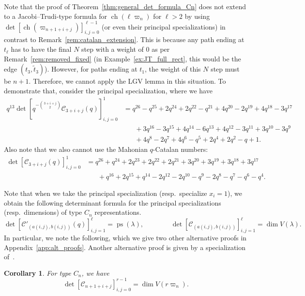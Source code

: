 \documentclass[11pt, leqno]{amsart}
\theoremstyle{plain}
\newtheorem{corollary}[theorem]{Corollary}
\theoremstyle{definition}
\numberwithin{equation}{section}
\newcommand{\fw}{\varpi} %
\newcommand{\Cat}{\mathcal{C}} %
\newcommand{\ch}{\operatorname{ch}} %
\newcommand{\ps}{\operatorname{ps}} %
\begin{document}
Note that the proof of Theorem~\ref{thm:general_det_formula_Cn} does not extend to a Jacobi--Trudi-type formula for $\ch(\ell \fw_n)$ for $\ell > 2$ by using $\det [\ch(\fw_{n+1+i+j})]_{i,j=0}^{\ell-1}$ (or even their principal specializations) in contrast to Remark~\ref{rem:catalan_extension}. This is because any path ending at $t_{\ell}$ has to have the final $N$ step with a weight of $0$ as per Remark~\ref{rem:removed_fixed} (in Example~\ref{ex:JT_full_rect}, this would be the edge $(t_3, \widetilde{t}_3)$). However, for paths ending at $t_1$, the weight of this $N$ step must be $n+1$. Therefore, we cannot apply the LGV lemma in this situation. To demonstrate that, consider the principal specialization, where we have
\begin{align*}
q^{13} \det [q^{-\binom{3+i+j}{2}} \Cat_{3+i+j}(q)]_{i,j=0}^1 & = q^{26} - q^{25} + 2q^{24} + 2q^{22} - q^{21} + 4q^{20} - 2q^{19} + 4q^{18} - 3q^{17}
\\ & \hspace{20pt} + 3q^{16} - 3q^{15} + 4q^{14} - 6q^{13} + 4q^{12} - 3q^{11} + 3q^{10} - 3q^{9}
\\ & \hspace{20pt} + 4q^{8} - 2q^{7} + 4q^{6} - q^{5} + 2q^{4} + 2q^{2} - q + 1.
\end{align*}
Also note that we also cannot use the Mahonian $q$-Catalan numbers:
\begin{align*}
\det [\Cat_{3+i+j}(q)]_{i,j=0}^1 & = q^{26} + q^{24} + 2q^{23} + 2q^{22} + 2q^{21} + 3q^{20} + 3q^{19} + 3q^{18} + 3q^{17}
\\ & \hspace{20pt} + q^{16} + 2q^{15} + q^{14} - 2q^{12} - 2q^{10} - q^{9} - 2q^{8} - q^{7} - q^{6} - q^{4}.
\end{align*}

Note that when we take the principal specialization (resp.\ specialize $x_i = 1$), we obtain the following determinant formula for the principal specializations (resp.\ dimensions) of type $C_n$ representations.
\[
\det [\Cat'_{(a(i,j), b(i,j))}(q) ]_{i,j=1}^{\ell} = \ps(\lambda),
\qquad\qquad
\det [\Cat_{(a(i,j), b(i,j))} ]_{i,j=1}^{\ell} = \dim V(\lambda).
\]
In particular, we note the following, which we give two other alternative proofs in Appendix~\ref{app:alt_proofs}.
Another alternative proof is given by a specialization of~\cite[Thm.~2.1]{Okada09}.

\begin{corollary}
\label{cor: Cn determinatal r omega_n}
For type $C_n$, we have
\[
\det [ \Cat_{n+1+i+j} ]_{i,j=0}^{r-1} = \dim V(r \fw_n).
\]
\end{corollary}
\end{document}
